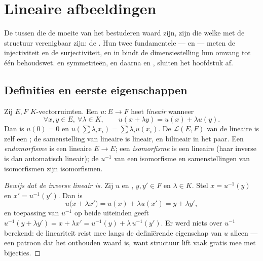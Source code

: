 \chapter{Lineaire afbeeldingen}\label{ch:b1:linmaps}

De  tussen  die de moeite van het
bestuderen waard zijn, zijn die welke met de structuur verenigbaar
zijn: de \emph{}. Hun twee fundamentele
 ---  en  --- meten de injectiviteit en de
surjectiviteit, en in  bindt de dimensiestelling hun
omvang tot één behoudswet.  en symmetrieën, en daarna
 en , sluiten het hoofdstuk af.

\section{Definities en eerste eigenschappen}

\begin{definition}\label{def:b1:linmaps:def}
Zij $E, F$ $K$-vectorruimten. Een  $u \colon E \to F$ heet
\emph{lineair} wanneer
\[
\forall x, y \in E,\ \forall \lambda \in K, \qquad
u(x + \lambda y) = u(x) + \lambda u(y).
\]
Dan is $u(0) = 0$ en $u(\sum \lambda_i x_i) = \sum \lambda_i
u(x_i)$. De  $\mathcal{L}(E, F)$ van de lineaire
 is zelf een ; de samenstelling van lineaire
 is lineair, en bilineair in het paar. Een
\emph{endomorfisme} is een lineaire $E \to E$; een
\emph{isomorfisme} is een  lineaire  (haar
inverse is dan automatisch lineair); de $u^{-1}$ van een
isomorfisme en samenstellingen van isomorfismen zijn isomorfismen.
\end{definition}

\begin{proof}[Bewijs dat de inverse lineair is]
Zij $u$  en , $y, y' \in F$ en $\lambda \in K$.
Stel $x = u^{-1}(y)$ en $x' = u^{-1}(y')$. Dan is
\[
u\bigl(x + \lambda x'\bigr) = u(x) + \lambda u(x')
= y + \lambda y' ,
\]
en toepassing van $u^{-1}$ op beide uiteinden geeft $u^{-1}(y +
\lambda y') = x + \lambda x' = u^{-1}(y) + \lambda\,u^{-1}(y')$.
Er werd niets over $u^{-1}$ berekend: de lineariteit reist mee
langs de definiërende eigenschap van $u$ alleen --- een patroon
dat het onthouden waard is, want structuur lift vaak gratis mee
met bijecties.
\end{proof}

